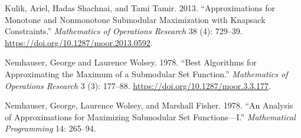 \documentclass[11pt]{article} %
\theoremstyle{definition}
\begin{document}
%
Kulik, Ariel, Hadas Shachnai, and Tami Tamir. 2013. ``Approximations for Monotone and Nonmonotone Submodular Maximization with Knapsack Constraints.'' \emph{Mathematics of Operations Research} 38 (4): 729--39. \url{https://doi.org/10.1287/moor.2013.0592}.

%
%
%
%
Nemhauser, George and Laurence Wolsey. 1978. ``Best Algorithms for Approximating the Maximum of a Submodular Set Function.'' \emph{Mathematics of Operations Research} 3 (3): 177--88. \url{https://doi.org/10.1287/moor.3.3.177}.

Nemhauser, George, Laurence Wolsey, and Marshall Fisher. 1978. ``An Analysis of Approximations for Maximizing Submodular Set Functions—I.'' \emph{Mathematical Programming} 14: 265--94. 
\end{document}
